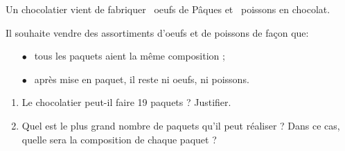 
Un chocolatier vient de fabriquer ~oeufs de Pâques et ~poissons en chocolat.

Il souhaite vendre des assortiments d'oeufs et de poissons de façon que:

\setlength\parindent{6mm}
\begin{itemize}
\item[$\bullet~~$] tous les paquets aient la même composition ;
\item[$\bullet~~$] après mise en paquet, il reste ni oeufs, ni poissons.
\end{itemize}
\setlength\parindent{0mm}

\medskip

\begin{enumerate}
\item Le chocolatier peut-il faire 19 paquets ? Justifier.
\item Quel est le plus grand nombre de paquets qu'il peut réaliser ? Dans ce cas, quelle
sera la composition de chaque paquet ?
\end{enumerate}




